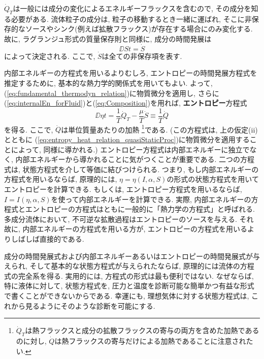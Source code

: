$\dot{Q}_T$は一般には成分の変化によるエネルギーフラックスを含むので, その成分を知る必要がある. 
流体粒子の成分は, 粒子の移動するとき一緒に運ばれ, 
そこに非保存的なソースやシンク(例えば拡散フラックス)が存在する場合にのみ変化する. 
故に, ラグランジュ形式の質量保存則と同様に, 成分の時間発展は
\begin{equation}
 \DD{S}{t} = \dot{S}
 \label{eq:Composition}
\end{equation}
によって決定される. 
ここで, $\dot{S}$は全ての非保存項を表す. 

内部エネルギーの方程式を用いるよりむしろ, エントロピーの時間発展方程式を推定するために, 
基本的な熱力学的関係式を用いてもよい. 
よって, (\ref{eq:fundamental_thermodyn_relation})に物質微分を適用し, 
さらに(\ref{eq:internalEn_forFluid})と(\ref{eq:Composition})を用れば, 
\textbf{エントロピー}方程式
\begin{equation}
 \DD{\eta}{t} = \dfrac{1}{T}\dot{Q}_T - \dfrac{\mu}{T}\dot{S} \equiv \dfrac{1}{T}\dot{Q}
  \label{eq:entropy_forFluid}
\end{equation}
を得る. 
ここで, $\dot{Q}$は単位質量あたりの加熱%
\footnote{
$\dot{Q}_T$は熱フラックスと成分の拡散フラックスの寄与の両方を含めた加熱であるのに対し, 
$\dot{Q}$は熱フラックスの寄与だけによる加熱であることに注意されたい. 
}である. 
(この方程式は, 上の仮定(ii) とともに (\ref{eq:entropy_heat_relation_quasiStaticProc})に物質微分を適用することによって, 同様に導かれる.)
エントロピー方程式は内部エネルギーに独立でなく, 内部エネルギーから導かれることに気がつくことが重要である. 
二つの方程式は, 状態方程式を介して等価に結びつけられる. 
つまり, もし内部エネルギーの方程式を用いるならば, 原理的には, $\eta=\eta(I,\alpha,S)$の形式の状態方程式を用いてエントロピーを計算できる.  
もしくは, エントロピー方程式を用いるならば, $I=I(\eta,\alpha,S)$を使って内部エネルギーを計算できる. 
実際, 内部エネルギーの方程式とエントロピーの方程式はともに一般的に「熱力学の方程式」と呼ばれる. 
多成分流体において, 不可逆な拡散過程はエントロピーのソースを与える. 
それ故に, 内部エネルギーの方程式を用いる方が, エントロピーの方程式を用いるよりしばしば直接的である. 

成分の時間発展式および内部エネルギーあるいはエントロピーの時間発展式が与えられ, 
そして基本的な状態方程式が与えられたならば, 原理的には流体の方程式の完全系を得る. 
実用的には, 方程式の形式は最も便利ではない. 
なぜならば, 特に液体に対して, 状態方程式を, 圧力と温度を診断可能な簡単かつ有益な形式で書くことができないからである. 
幸運にも, 理想気体に対する状態方程式は, これから見るようにそのような診断を可能にする. 

